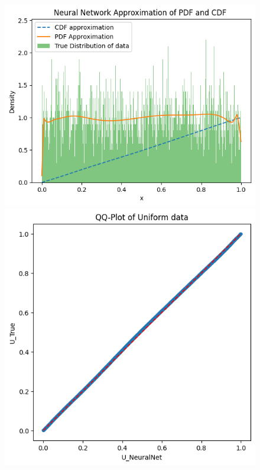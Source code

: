 \begin{figure}
\begin{minipage}{0.45\textwidth}
\begin{minipage}{0.48\textwidth}
        \end{minipage}
    \end{minipage}

    \vspace{1em}

    \begin{minipage}{0.45\textwidth}
        \centering
        \begin{minipage}{0.48\textwidth}
            \centering
            \includegraphics[width=\textwidth]{5ResultsDiscussion/pictures/MarginalTest/UniformHistogram.png}
        \end{minipage}
        \hfill
        \begin{minipage}{0.48\textwidth}
            \centering
            \includegraphics[width=\textwidth]{5ResultsDiscussion/pictures/MarginalTest/UniformQQ.png}

\end{minipage}
\end{minipage}
\end{figure}
